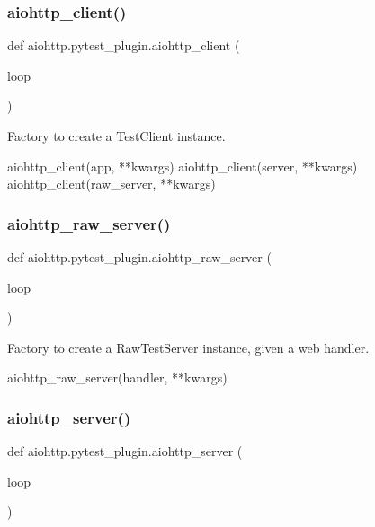 \subsubsection{\texorpdfstring{aiohttp\+\_\+client()}{aiohttp\_client()}}
{\footnotesize\ttfamily def aiohttp.\+pytest\+\_\+plugin.\+aiohttp\+\_\+client (\begin{DoxyParamCaption}\item[{}]{loop }\end{DoxyParamCaption})}

\begin{DoxyVerb}Factory to create a TestClient instance.

aiohttp_client(app, **kwargs)
aiohttp_client(server, **kwargs)
aiohttp_client(raw_server, **kwargs)
\end{DoxyVerb}
 \mbox{\label{namespaceaiohttp_1_1pytest__plugin_a53921f00d47161b403b2fb3632805edf}} 
\subsubsection{\texorpdfstring{aiohttp\+\_\+raw\+\_\+server()}{aiohttp\_raw\_server()}}
{\footnotesize\ttfamily def aiohttp.\+pytest\+\_\+plugin.\+aiohttp\+\_\+raw\+\_\+server (\begin{DoxyParamCaption}\item[{}]{loop }\end{DoxyParamCaption})}

\begin{DoxyVerb}Factory to create a RawTestServer instance, given a web handler.

aiohttp_raw_server(handler, **kwargs)
\end{DoxyVerb}
 \mbox{\label{namespaceaiohttp_1_1pytest__plugin_a2b336ccaec737fd03defdd7b85534093}} 
\subsubsection{\texorpdfstring{aiohttp\+\_\+server()}{aiohttp\_server()}}
{\footnotesize\ttfamily def aiohttp.\+pytest\+\_\+plugin.\+aiohttp\+\_\+server (\begin{DoxyParamCaption}\item[{}]{loop }\end{DoxyParamCaption})}

